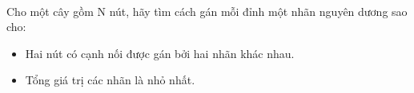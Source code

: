  

Cho một cây gồm N nút, hãy tìm cách gán mỗi đỉnh một nhãn nguyên dương sao cho:
\begin{itemize}
	\item Hai nút có cạnh nối được gán bởi hai nhãn khác nhau.
	\item Tổng giá trị các nhãn là nhỏ nhất.
\end{itemize}

\
